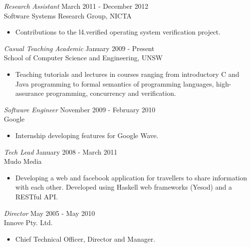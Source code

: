 \documentclass[line,margin]{res}
\begin{document}
\begin{resume}
\begin{itemize}
                \end{itemize}
 
                {\sl Research Assistant} \hfill March 2011 - December 2012 \\
                 Software Systems Research Group, NICTA
                 \begin{itemize}  \itemsep -2pt %
                 \item Contributions to the l4.verified operating system verification project.
                 \end{itemize} 
                {\sl Casual Teaching Academic} \hfill January 2009 - Present \\
                 School of Computer Science and Engineering, UNSW
                  \begin{itemize}
                    \item Teaching tutorials and lectures in courses ranging from introductory C and Java programming to
                         formal semantics of programming languages, high-assurance programming,
                         concurrency and verification.
                   \end{itemize} 
 
                {\sl Software Engineer} \hfill November 2009 - February 2010\\
                 Google
                  \begin{itemize}
                       \item Internship developing features for Google Wave.
                   \end{itemize} 

                {\sl Tech Lead} \hfill January 2008 - March 2011\\
                 Mudo Media
                  \begin{itemize}
                       \item Developing a web and facebook application for travellers to share information with each other. Developed using Haskell web frameworks (Yesod) and a RESTful API.
                   \end{itemize} 
             
                {\sl Director} \hfill May 2005 - May 2010\\
                  Innove Pty. Ltd.
                  \begin{itemize}
                       \item Chief Technical Officer, Director and Manager.
                   \end{itemize} 
 

\end{resume}
\end{document}
